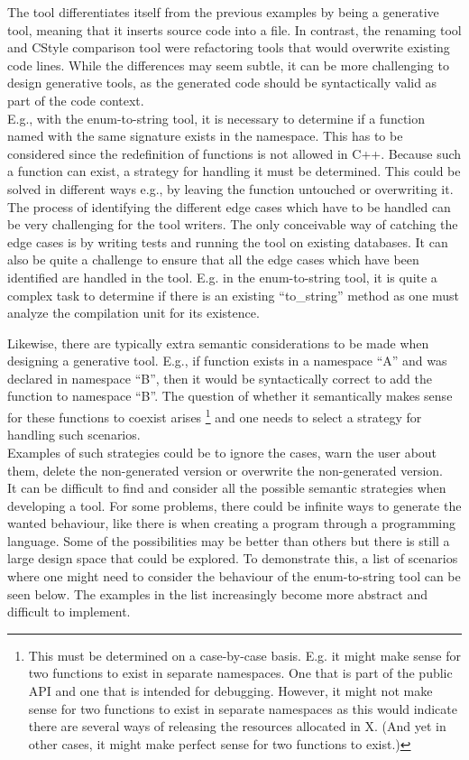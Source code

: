 The tool differentiates itself from the previous examples by being a generative tool, meaning that it inserts source code into a file.
In contrast, the renaming tool and CStyle comparison tool were refactoring tools that would overwrite existing code lines.
While the differences may seem subtle, it can be more challenging to design generative tools, as the generated code should be syntactically valid as part of the code context.\\
E.g., with the enum-to-string tool, it is necessary to determine if a function named  with the same signature exists in the namespace. This has to be considered since the redefinition of functions is not allowed in C++.
Because such a function can exist, a strategy for handling it must be determined. This could be solved in different ways e.g., by leaving the function untouched or overwriting it. The process of identifying the different edge cases which have to be handled can be very challenging for the tool writers. The only conceivable way of catching the edge cases is by writing tests and running the tool on existing databases. 
It can also be quite a challenge to ensure that all the edge cases which have been identified are handled in the tool. E.g. in the enum-to-string tool, it is quite a complex task to determine if there is an existing ``to\_string'' method as one must analyze the compilation unit for its existence.

Likewise, there are typically extra semantic considerations to be made when designing a generative tool. E.g., if  function exists in a namespace ``A'' and  was declared in namespace ``B'', then it would be syntactically correct to add the  function to namespace ``B''. The question of whether it semantically makes sense for these functions to coexist arises
\footnote{This must be determined on a case-by-case basis. E.g. it might make sense for two  functions to exist in separate namespaces. One that is part of the public API and one that is intended for debugging. However, it might not make sense for two  functions to exist in separate namespaces as this would indicate there are several ways of releasing the resources allocated in X. (And yet in other cases, it might make perfect sense for two  functions to exist.)}
and one needs to select a strategy for handling such scenarios.\\
Examples of such strategies could be to ignore the cases, warn the user about them, delete the non-generated version or overwrite the non-generated version.\\
It can be difficult to find and consider all the possible semantic strategies when developing a tool. For some problems, there could be infinite ways to generate the wanted behaviour, like there is when creating a program through a programming language. Some of the possibilities may be better than others but there is still a large design space that could be explored.
To demonstrate this, a list of scenarios where one might need to consider the behaviour of the enum-to-string tool can be seen below. The examples in the list increasingly become more abstract and difficult to implement.

